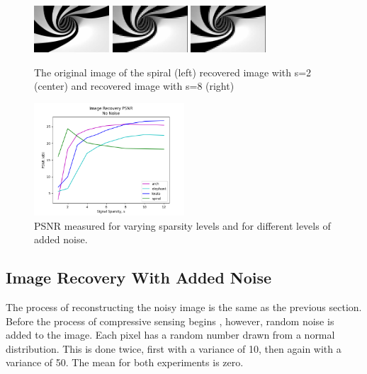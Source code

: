 \documentclass{article}
\begin{document}
\begin{figure}[H]
    \captionsetup{width=.5\linewidth}
    \centering
        \includegraphics[width=0.25\textwidth]{images/spiral.png}
        \includegraphics[width=0.25\textwidth]{images/spiral-recovered_02.png}
        \includegraphics[width=0.25\textwidth]{images/spiral-recovered_08.png}
        \caption{The original image of the spiral (left) recovered image with s=2 (center) and recovered image with s=8 (right)}
\end{figure}



\begin{figure}[H]
    \captionsetup{width=.5\linewidth}
    \centering
        \includegraphics[width=0.5\textwidth]{plots/d3-no-noise.png}
        \caption{PSNR measured for varying sparsity levels and for different levels of added noise.}
\end{figure}




\newpage
\subsection*{Image Recovery With Added Noise}

The process of reconstructing the noisy image is the same as the previous section.
Before the process of compressive sensing begins , however, random noise is added to the image.
Each pixel has a random number drawn from a normal distribution.
This is done twice, first with a variance of 10, then again with a variance of 50.
The mean for both experiments is zero.
\end{document}
